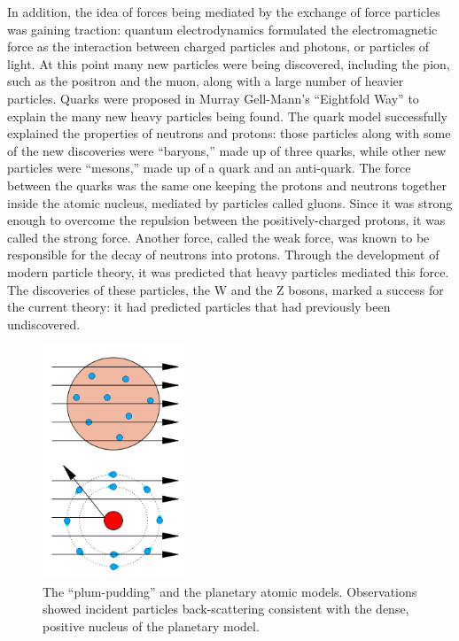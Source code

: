 In addition, the idea of forces being mediated by the exchange 
of force particles was gaining traction: 
quantum electrodynamics formulated the electromagnetic force 
as the interaction between charged particles and photons, 
or particles of light.  
At this point many new particles were being discovered, 
including the pion, 
such 
as the positron and the muon, 
along with a large number of heavier particles.  
Quarks were proposed in Murray Gell-Mann's ``Eightfold Way'' 
to explain the many new heavy particles 
being found. %
The quark model successfully explained the 
properties of neutrons and protons: 
those particles along with some of the new discoveries 
were ``baryons,'' made up of three quarks, 
while other new particles were ``mesons,'' 
made up of a quark and an anti-quark.  
The force between the quarks was the same one 
keeping the protons and neutrons together inside the 
atomic nucleus, 
mediated by particles called gluons.  
Since it was strong enough to overcome the repulsion 
between the positively-charged protons, 
it was called the strong force.  
Another force, called the weak force, 
was known to be responsible for the decay of 
neutrons into protons.  
Through the development of modern particle theory, 
it was predicted that heavy particles mediated this force.  
The discoveries of these particles, the W and the Z bosons, 
marked a success for the current theory: 
it had predicted particles that had previously been 
undiscovered.  

 \begin{figure}[htb]
  \begin{center}
    \includegraphics[width=120pt]{Figures/overview-220px-Gold_foil_experiment_conclusions_svg-opaque.png}
  \end{center}
  \caption[\fixspacing The ``plum-pudding'' and the planetary atomic models. ]
	  {\fixspacing The ``plum-pudding'' and the planetary atomic models. 
	    Observations showed incident particles back-scattering 
	    consistent with the dense, positive nucleus of 
	    the planetary model. 
	  }
  \label{fig:AtomicModels}
 \end{figure}



